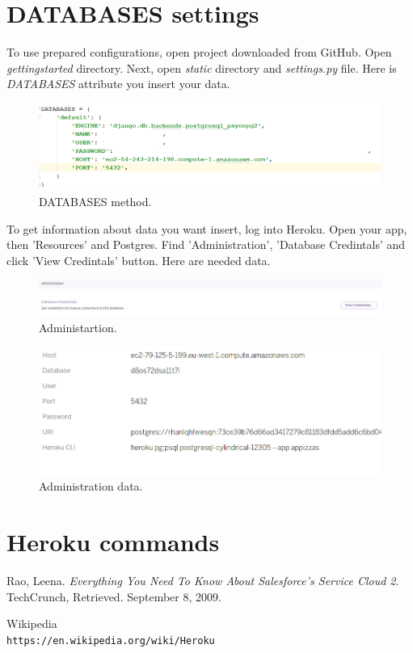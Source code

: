 \documentclass[12pt,a4paper]{article}
\begin{document}
\section{DATABASES settings}
To use prepared configurations, open project downloaded from GitHub. Open \textit{gettingstarted} directory. Next, open \textit{static} directory and \textit{settings.py} file. Here is \textit{DATABASES} attribute you insert your data.  

\begin{figure}[H]
	\centering
	\includegraphics[width=1\textwidth]{images/databases.PNG}
	\caption{DATABASES method.}
	\label{fig:data}
\end{figure}

To get information about data you want insert, log into Heroku. Open your app, then 'Resources' and Postgres. Find 'Administration', 'Database Credintals' and click 'View Credintals' button. Here are needed data.

\begin{figure}[H]
	\centering
	\includegraphics[width=1\textwidth]{images/admin.PNG}
	\caption{Administartion.}
	\label{fig:ad}
\end{figure}

\begin{figure}[H]
	\centering
	\includegraphics[width=1\textwidth]{images/datas.PNG}
	\caption{Administration data.}
	\label{fig:da}
\end{figure}


\section{Heroku commands}


\begin{thebibliography}{bib}
	 Rao, Leena. 
	\textit{Everything You Need To Know About Salesforce's Service Cloud 2}. 
	TechCrunch, Retrieved. September 8, 2009.
	 
	
	Wikipedia
	\\\texttt{https://en.wikipedia.org/wiki/Heroku}
	
\end{thebibliography}
\end{document}
